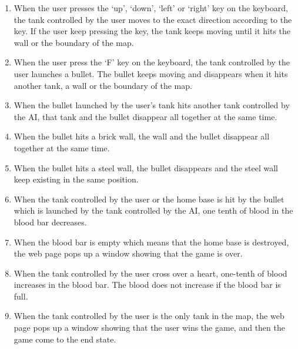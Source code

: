 \documentclass{article}
\begin{document}
\begin{enumerate}
\item When the user presses the `up', `down', `left' or `right' key on the 
keyboard, the tank controlled by the user moves to the exact direction according 
to the key. If the user keep pressing the key, the tank keeps moving until it 
hits the wall or the boundary of the map.
\item When the user press the `F' key on the keyboard, the tank controlled by the
 user launches a bullet. The bullet keeps moving and disappears when it hits 
 another tank, a wall or the boundary of the map.
\item When the bullet launched by the user's tank hits another tank controlled 
by the AI, that tank and the bullet disappear all together at the same time.
\item When the bullet hits a brick wall, the wall and the bullet disappear all 
together at the same time.
\item When the bullet hits a steel wall, the bullet disappears and the steel 
wall keep existing in the same position.
\item When the tank controlled by the user or the home base is hit by the 
bullet which is launched by the tank controlled by the AI, one tenth of blood 
in the blood bar decreases.
\item When the blood bar is empty which means that the home base is destroyed, 
the web page pops up a window showing that the game is over.
\item When the tank controlled by the user cross over a heart, one-tenth of 
blood increases in the blood bar. The blood does not increase if the blood bar 
is full.
\item When the tank controlled by the user is the only tank in the map, the web 
page pops up a window showing that the user wins the game, and then the game 
come to the end state.
\end{enumerate}
\end{document}
